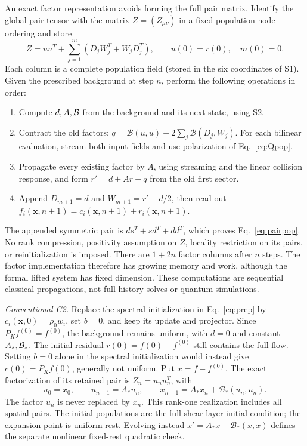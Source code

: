 \documentclass[10pt,letterpaper]{article}
\begin{document}
An exact factor representation avoids forming the full pair matrix. Identify the global pair tensor with the matrix $Z=(Z_{\mu\nu})$ in a fixed population-node ordering and store
\begin{equation}
 Z=u u^T+\sum_{j=1}^{m}(D_jW_j^T+W_jD_j^T),\qquad
 u(0)=r(0),\quad m(0)=0.
 \label{eq:factor}
\end{equation}
Each column is a complete population field (stored in the six coordinates of S1). Given the prescribed background at step $n$, perform the following operations in order:
\begin{enumerate}
\item Compute $d,A,\mathcal B$ from the background and its next state, using S2.
\item Contract the old factors: $q=\mathcal B(u,u)+2\sum_j\mathcal B(D_j,W_j)$. For each bilinear evaluation, stream both input fields and use polarization of Eq.~\eqref{eq:Qpop}.
\item Propagate every existing factor by $A$, using streaming and the linear collision response, and form $r'=d+Ar+q$ from the old first sector.
\item Append $D_{m+1}=d$ and $W_{m+1}=r'-d/2$, then read out $f_i(\bm x,n+1)=c_i(\bm x,n+1)+r_i(\bm x,n+1)$.
\end{enumerate}
The appended symmetric pair is $ds^T+sd^T+dd^T$, which proves Eq.~\eqref{eq:pairpop}. No rank compression, positivity assumption on $Z$, locality restriction on its pairs, or reinitialization is imposed. There are $1+2n$ factor columns after $n$ steps. The factor implementation therefore has growing memory and work, although the formal lifted system has fixed dimension. These computations are sequential classical propagations, not full-history solves or quantum simulations.

\textit{Conventional C2.} Replace the spectral initialization in Eq.~\eqref{eq:prep} by $c_i(\bm x,0)=\rho_0w_i$, set $b=0$, and keep its update and projector. Since $P_Kf^{(0)}=f^{(0)}$, the background remains uniform, with $d=0$ and constant $A_*,\mathcal B_*$. The initial residual $r(0)=f(0)-f^{(0)}$ still contains the full flow. Setting $b=0$ alone in the spectral initialization would instead give $c(0)=P_Kf(0)$, generally not uniform. Put $x=f-f^{(0)}$. The exact factorization of its retained pair is $Z_n=u_nu_n^T$, with
\begin{equation}
 u_0=x_0,\qquad u_{n+1}=A_*u_n,\qquad
 x_{n+1}=A_*x_n+\mathcal B_*(u_n,u_n).
 \label{eq:baseline}
\end{equation}
The factor $u_n$ is never replaced by $x_n$. This rank-one realization includes all spatial pairs. The initial populations are the full shear-layer initial condition; the expansion point is uniform rest. Evolving instead $x'=A_*x+\mathcal B_*(x,x)$ defines the separate nonlinear fixed-rest quadratic check.
\end{document}
